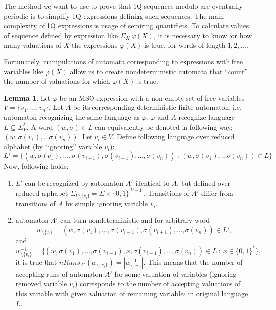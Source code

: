 \documentclass[12pt]{article}
\theoremstyle{definition}
\newtheorem{lemma}[theorem]{Lemma}
\begin{document}
The method we want to use to prove that 1Q sequences modulo are eventually periodic is to simplify 1Q expressions defining such sequences. The main complexity of 1Q expressions is usage of semiring quantifiers. To calculate values of sequence defined by expression like $\Sigma_X \ \varphi(X)$, it is necessary to know for how many valuations of $X$ the expressions $\varphi(X)$ is true, for words of length $1,2,\ldots$.

Fortunately, manipulations of automata corresponding to expressions with free variables like $\varphi(X)$ allow us to create nondeterministic automata that ``count'' the number of valuations for which $\varphi(X)$ is true.

\begin{lemma}
\label{LemElimVar}
    Let $\varphi$ be an MSO expression with a non-empty set of free variables $V = \{v_1, \ldots, v_n\}$. Let $A$ be its corresponding deterministic finite automaton, i.e. automaton recognizing the same language as $\varphi$. $\varphi$ and $A$ recognize language $L \subseteq \Sigma_V^*$. A word $(w, \sigma) \in L$ can equivalently be denoted in following way: $(w, \sigma(v_1), \ldots \sigma(v_n))$. Let $v_i \in V$. Define following language over reduced alphabet (by ``ignoring'' variable $v_i$): 
    $$L' = \{(w, \sigma(v_1), \ldots, \sigma(v_{i-1}), \sigma(v_{i+1}), \ldots, \sigma(v_n)) \ : \ (w, \sigma(v_1), \ldots \sigma(v_n)) \in L\}$$
    Now, following holds:
    \begin{enumerate}
        \item $L'$ can be recognized by automaton $A'$ identical to $A$, but defined over reduced alphabet $\Sigma_{V \setminus \{v_i\}} = \Sigma \times \{0, 1\}^{|V-1|}$. Transitions of $A'$ differ from transitions of $A$ by simply ignoring variable $v_i$,
        \item automaton $A'$ can turn nondeterministic and for arbitrary word
        $$w_{\setminus\{v_i\}} = (w, \sigma(v_1), \ldots, \sigma(v_{i-1}), \sigma(v_{i+1}), \ldots, \sigma(v_n)) \in L',$$ and 
        $$w^{-1}_{\setminus\{v_i\}} = \{(w, \sigma(v_1), \ldots, \sigma(v_{i-1}), x, \sigma(v_{i+1}), \ldots, \sigma(v_n)) \in L \ : \ x \in \{0, 1\}^* \},$$
        it is true that $nRuns_{A'}(w_{\setminus\{v_i\}}) = |w^{-1}_{\setminus\{v_i\}}|$. This means that the number of accepting runs of automaton $A'$ for some valuation of variables (ignoring removed variable $v_i$) corresponds to the number of accepting valuations of this variable with given valuation of remaining variables in original language $L$.
    \end{enumerate}
\end{lemma}
\end{document}
